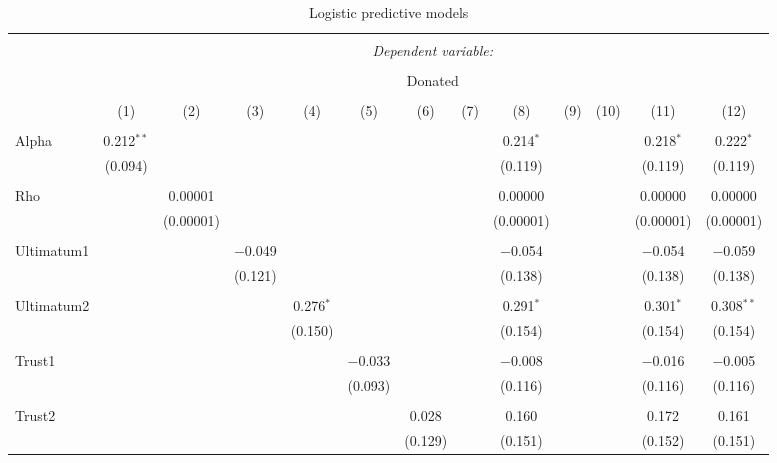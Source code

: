 \documentclass[12pt]{article}
\begin{document}
\begin{table}[!htbp] \centering 
  \caption{Logistic predictive models} 
  \label{} 
  \begin{adjustbox}{width=\textwidth}
\begin{tabular}{@{\extracolsep{5pt}}lcccccccccccc} 
\\[-1.8ex]\hline 
\hline \\[-1.8ex] 
 & \multicolumn{12}{c}{\textit{Dependent variable:}} \\ 
\cline{2-13} 
\\[-1.8ex] & \multicolumn{12}{c}{Donated} \\ 
\\[-1.8ex] & (1) & (2) & (3) & (4) & (5) & (6) & (7) & (8) & (9) & (10) & (11) & (12)\\ 
\hline \\[-1.8ex] 
 Alpha & 0.212$^{**}$ &  &  &  &  &  &  & 0.214$^{*}$ &  &  & 0.218$^{*}$ & 0.222$^{*}$ \\ 
  & (0.094) &  &  &  &  &  &  & (0.119) &  &  & (0.119) & (0.119) \\ 
  & & & & & & & & & & & & \\ 
 Rho &  & 0.00001 &  &  &  &  &  & 0.00000 &  &  & 0.00000 & 0.00000 \\ 
  &  & (0.00001) &  &  &  &  &  & (0.00001) &  &  & (0.00001) & (0.00001) \\ 
  & & & & & & & & & & & & \\ 
 Ultimatum1 &  &  & $-$0.049 &  &  &  &  & $-$0.054 &  &  & $-$0.054 & $-$0.059 \\ 
  &  &  & (0.121) &  &  &  &  & (0.138) &  &  & (0.138) & (0.138) \\ 
  & & & & & & & & & & & & \\ 
 Ultimatum2 &  &  &  & 0.276$^{*}$ &  &  &  & 0.291$^{*}$ &  &  & 0.301$^{*}$ & 0.308$^{**}$ \\ 
  &  &  &  & (0.150) &  &  &  & (0.154) &  &  & (0.154) & (0.154) \\ 
  & & & & & & & & & & & & \\ 
 Trust1 &  &  &  &  & $-$0.033 &  &  & $-$0.008 &  &  & $-$0.016 & $-$0.005 \\ 
  &  &  &  &  & (0.093) &  &  & (0.116) &  &  & (0.116) & (0.116) \\ 
  & & & & & & & & & & & & \\ 
 Trust2 &  &  &  &  &  & 0.028 &  & 0.160 &  &  & 0.172 & 0.161 \\ 
  &  &  &  &  &  & (0.129) &  & (0.151) &  &  & (0.152) & (0.151) \\ 

\end{tabular}
\end{adjustbox}
\end{table}
\end{document}
